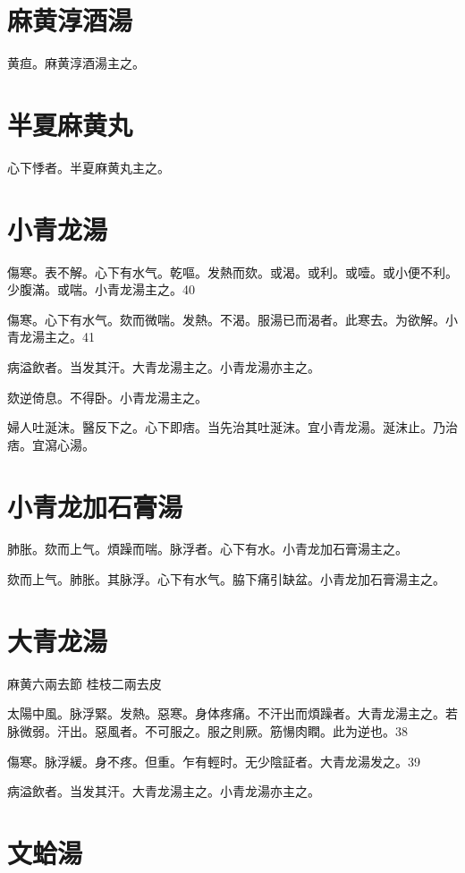 \documentclass[b5paper,twoside,zihao=-4,UTF8]{ctexbook}
\begin{document}
\section{麻黄淳酒湯}

黄疸。麻黄淳酒湯主之。

\section{半夏麻黄丸}

心下悸者。半夏麻黄丸主之。

\section{小青龙湯}

傷寒。表不解。心下有水气。乾嘔。发熱而欬。或渴。或利。或噎。或小便不利。少腹滿。或喘。小青龙湯主之。40

傷寒。心下有水气。欬而微喘。发熱。不渴。服湯已而渴者。此寒去。为欲解。小青龙湯主之。41

病溢飲者。当发其汗。大青龙湯主之。小青龙湯亦主之。

欬逆倚息。{不得卧。}小青龙湯主之。

婦人吐涎沫。醫反下之。心下即痞。当先治其吐涎沫。宜小青龙湯。涎沫止。乃治痞。宜瀉心湯。

\section{小青龙加石膏湯}

肺胀。欬而上气。煩躁而喘。脉浮者。心下有水。小青龙加石膏湯主之。

欬而上气。肺胀。其脉浮。心下有水气。脇下痛引缺盆。小青龙加石膏湯主之。

\section{大青龙湯}

麻黄{\scriptsize 六兩去節} 桂枝{\scriptsize 二兩去皮}

太陽中風。脉浮緊。发熱。惡寒。身{体}疼痛。不汗出而煩躁者。大青龙湯主之。若脉微弱。汗出。惡風者。不可服之。服之則厥。筋愓肉瞤。此为逆也。38

傷寒。脉浮緩。身不疼。但重。乍有輕时。无少陰証者。大青龙湯发之。39

病溢飲者。当发其汗。大青龙湯主之。小青龙湯亦主之。

\section{文蛤湯}
\end{document}
